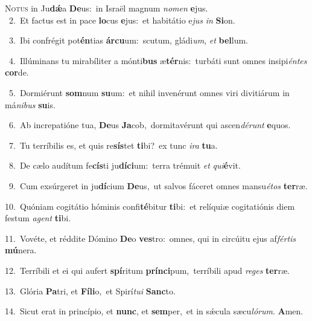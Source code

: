 \lettrine{\initial\textcolor{\initialcolor}{N}}{otus} in Ju\-\textbf{dǽ}\-a \textbf{De}\-us:~\star in Israël magnum \textit{no}\-\textit{men} \textbf{e}\-jus.\\
{\numbfont\textcolor{\numbcolor}{~2.}}~Et factus est in pace \textbf{lo}\-cus \textbf{e}\-jus:~\star et habitátio e\textit{jus} \textit{in} \textbf{Si}\-on.\par
{\numbfont\textcolor{\numbcolor}{~3.}}~Ibi confrégit pot\-\textbf{én}\-tias \textbf{ár}\-\textbf{cu}um:~\star scutum, gládi\-\textit{um}\-, \textit{et} \textbf{bel}\-lum.\par
{\numbfont\textcolor{\numbcolor}{~4.}}~Illúminans tu mirabíliter a mónti\textbf{bus} æ\-\textbf{tér}\-nis:~\star turbáti sunt omnes insipi\-\textit{én}\-\textit{tes} \textbf{cor}\-de.\par
{\numbfont\textcolor{\numbcolor}{~5.}}~Dormiérunt \textbf{som}\-num \textbf{su}\-um:~\star et nihil invenérunt omnes viri divitiárum in má\-\textit{ni}\-\textit{bus} \textbf{su}\-is.\par
{\numbfont\textcolor{\numbcolor}{~6.}}~Ab increpatióne tua, \textbf{De}\-us \textbf{Ja}\-cob,~\star dormitavérunt qui ascen\-\textit{dé}\-\textit{runt} \textbf{e}\-quos.\par
{\numbfont\textcolor{\numbcolor}{~7.}}~Tu terríbilis es, et quis re\-\textbf{sís}\-tet \textbf{ti}\-bi?~\star ex tunc \textit{i}\-\textit{ra} \textbf{tu}\-a.\par
{\numbfont\textcolor{\numbcolor}{~8.}}~De cælo audítum fe\-\textbf{cís}\-ti ju\-\textbf{dí}\-\textbf{ci}um:~\star terra trémuit \textit{et} \textit{qui}\-\textbf{é}vit.\par
{\numbfont\textcolor{\numbcolor}{~9.}}~Cum exsúrgeret in ju\-\textbf{dí}\-cium \textbf{De}\-us,~\star ut salvos fáceret omnes mansu\-\textit{é}\-\textit{tos} \textbf{ter}\-ræ.\par
{\numbfont\textcolor{\numbcolor}{10.}}~Quóniam cogitátio hóminis confi\-\textbf{té}\-bitur \textbf{ti}\-bi:~\star et relíquiæ cogitatiónis diem festum \textit{a}\-\textit{gent} \textbf{ti}\-bi.\par
{\numbfont\textcolor{\numbcolor}{11.}}~Vovéte, et réddite Dómino \textbf{De}\-o \textbf{ves}\-tro:~\star omnes, qui in circúitu ejus af\-\textit{fér}\-\textit{tis} \textbf{mú}\-nera.\par
{\numbfont\textcolor{\numbcolor}{12.}}~Terríbili et ei qui aufert \textbf{spí}\-ritum \textbf{prín}\-\textbf{ci}pum,~\star terríbili apud \textit{re}\-\textit{ges} \textbf{ter}\-ræ.\par
{\numbfont\textcolor{\numbcolor}{13.}}~Glória \textbf{Pa}\-tri, et \textbf{Fí}\-\textbf{li}o,~\star et Spirí\-\textit{tu}\-\textit{i} \textbf{Sanc}\-to.\par
{\numbfont\textcolor{\numbcolor}{14.}}~Sicut erat in princípio, et \textbf{nunc}\-, et \textbf{sem}\-per,~\star et in sǽcula sæcu\-\textit{ló}\-\textit{rum}. \textbf{A}\-men.\par

